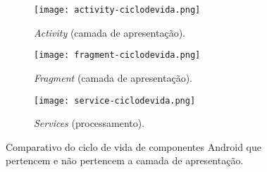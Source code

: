 \begin{figure*}[!htb]
\centering
  \begin{subfigure}[b]{.33\textwidth}
    \centering
    \texttt{[image: activity-ciclodevida.png]}
    \caption{\textit{Activity} (camada de apresentação).}
    \label{fig:activity-lifecycle}
  \end{subfigure}
  \begin{subfigure}[b]{.33\textwidth}
    \centering
    \texttt{[image: fragment-ciclodevida.png]}
    \caption{\textit{Fragment} (camada de apresentação).}
    \label{fig:activity-lifecycle}
  \end{subfigure}
  \begin{subfigure}[b]{.33\textwidth}
    \centering
    \texttt{[image: service-ciclodevida.png]}
    \caption{\textit{Services} (processamento).}
    \label{fig:service-lifecycle}
  \end{subfigure}%
\caption{Comparativo do ciclo de vida de componentes Android que pertencem e não pertencem a camada de apresentação.}
\label{fig:android-lifecycles}
\vspace{-.5cm} 
\end{figure*}

